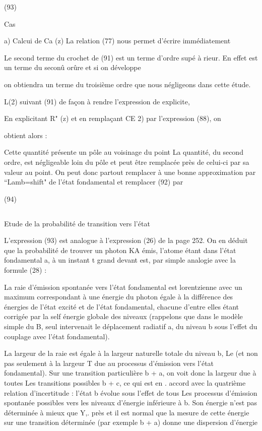 (93)

Cas

a) Calcui de Ca (z)
La relation (77) nous permet d'écrire immédiatement

Le second terme du crochet de (91) est un terme d'ordre supé
à 
rieur. En effet  est un terme du seconû orûre et si on développe

on obtiendra un terme du troisième ordre que nous négligeons dans cette étude.

L(2) suivant (91) de façon à rendre l'expression de  explicite,

En explicitant R" (z) et en remplaçant CE 2) par l'expression (88), on

obtient alors :

Cette quantité présente un pôle au voisinage du point
La quantité, du second ordre, est négligeable loin du pôle et peut
être remplacée près de celui-ci par sa valeur au point. On peut
donc partout remplacer à une bonne approximation  par
 “Lamb=shift" de l'état fondamental et remplacer (92) par


(94)


\subsection{} Etude de la probabilité de transition vers l'état%

L'expression (93) est analogue à l'expression (26)
de la page 252. On en déduit que la probabilité de trouver un photon KA
émis, l'atome étant dans l'état fondamental a, à un instant t grand devant
 est, par simple analogie avec la formule (28) :

La raie d'émission spontanée vers l'état fondamental est lorentzienne avec
un maximum correspondant à une énergie du photon égale à la différence des
énergies de l'état excité et de l'état fondamental, chacune d'entre elles
étant corrigée par la self énergie globale des niveaux (rappelons que dans
le modèle simple du  B, seul intervenait le déplacement radiatif a, du
niveau b sous l'effet du couplage avec l'état fondamental).

La largeur de la raie est égale à la largeur naturelle totale
du niveau b, Le (et non pas seulement à la largeur T due au processus d'émission vers l'état fondamental). Sur une transition particulière b + a, on voit
donc la largeur due à toutes Les transitions possibles b + c, ce qui est en .
accord avec la quatrième relation d'incertitude : l'état b évolue sous l'effet
de tous Les processus d'émission spontanée possibles vers les niveaux
d'énergie inférieure à b. Son énergie n'est pas déterminée à mieux que Y,.
près et il est normal que la mesure de cette énergie sur une transition
déterminée (par exemple b + a) donne une dispersion d'énergie 

